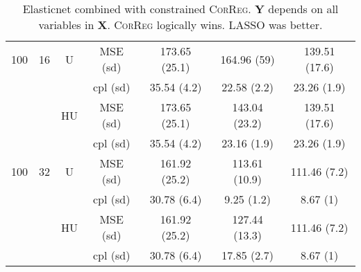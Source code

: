 \documentclass[11pt,a4paper]{article}
\begin{document}
\begin{table}[h!]
\begin{tabular}{|c|c|c|c|c|c|c|}
100 & 16 & U&  MSE (sd) & 173.65 (25.1) & 164.96 (59) & 139.51 (17.6) \\
& & &  cpl (sd) & 35.54 (4.2) & 22.58 (2.2) & 23.26 (1.9) \\
 &  &HU &  MSE (sd) & 173.65 (25.1) & 143.04 (23.2) & 139.51 (17.6) \\
& & & cpl (sd) & 35.54 (4.2) & 23.16 (1.9) & 23.26 (1.9) \\
\hline %
100 & 32 & U&  MSE (sd) & 161.92 (25.2) & 113.61 (10.9) & 111.46 (7.2) \\
& & &  cpl (sd) & 30.78 (6.4) & 9.25 (1.2) & 8.67 (1) \\
 &  &HU &  MSE (sd) & 161.92 (25.2) & 127.44 (13.3) & 111.46 (7.2) \\
& & &cpl (sd) & 30.78 (6.4) & 17.85 (2.7) & 8.67 (1) \\
\hline
\end{tabular} 
\caption{Elasticnet combined with constrained \textsc{CorReg}. $\boldsymbol{Y}$  depends on all variables in $\boldsymbol{X}$. \textsc{CorReg} logically wins. LASSO was better.}\label{YXlinenet}
\end{table}
\end{document}
